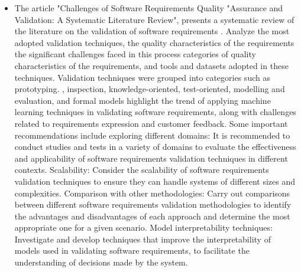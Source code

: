 \begin{itemize}
 \item The article "Challenges of Software Requirements Quality "Assurance and Validation: A Systematic Literature Review", presents a systematic review of the literature on the validation of software requirements \cite{Atoum2021}. Analyze the most adopted validation techniques, the quality characteristics of the requirements the significant challenges faced in this process categories of quality characteristics of the requirements, and tools and datasets adopted in these techniques. Validation techniques were grouped into categories such as prototyping. , inspection, knowledge-oriented, test-oriented, modelling and evaluation, and formal models highlight the trend of applying machine learning techniques in validating software requirements, along with challenges related to requirements expression and customer feedback. Some important recommendations include exploring different domains: It is recommended to conduct studies and tests in a variety of domains to evaluate the effectiveness and applicability of software requirements validation techniques in different contexts. Scalability: Consider the scalability of software requirements validation techniques to ensure they can handle systems of different sizes and complexities. Comparison with other methodologies: Carry out comparisons between different software requirements validation methodologies to identify the advantages and disadvantages of each approach and determine the most appropriate one for a given scenario. Model interpretability techniques: Investigate and develop techniques that improve the interpretability of models used in validating software requirements, to facilitate the understanding of decisions made by the system.
 \end{itemize}

